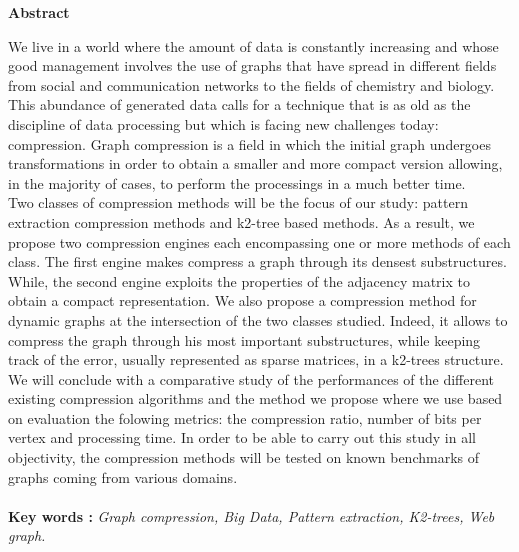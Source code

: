 \newpage
\thispagestyle{plain}
\begin{center}
	\par
	\textbf{
		\vskip 0.5in
		\LARGE 
			Abstract \\[0.15in]
	}
\end{center}
	\par
    
    We live in a world where the amount of data is constantly increasing and whose good management involves the use of graphs that have spread in different fields from social and communication networks to the fields of chemistry and biology. This abundance of generated data calls for a technique that is as old as the discipline of data processing but which is facing new challenges today: compression. Graph compression is a field in which the initial graph undergoes transformations in order to obtain a smaller and more compact version allowing, in the majority of cases, to perform the processings in a much better time.\\

 Two classes of compression methods will be the focus of our study: pattern extraction compression methods and k2-tree based methods. As a result, we propose two compression engines each encompassing one or more methods of each class. The first engine makes  compress a graph through its densest substructures. While, the second engine exploits the properties of the adjacency matrix to obtain a compact representation. We also propose a compression method for dynamic graphs at the intersection of the two classes studied. Indeed, it allows to compress the graph through his most important substructures, while keeping track of the error, usually represented as sparse matrices, in a k2-trees structure.\\
 
 We will conclude with a comparative study of the performances of the different existing compression algorithms and the method we propose where we use based on evaluation the folowing metrics: the compression ratio, number of bits per vertex and processing time. In order to be able to carry out this study in all objectivity, the compression methods will be tested on known benchmarks of graphs coming from various domains. \\\\\textbf{Key words :} \textit{Graph compression, Big Data, Pattern extraction, K2-trees, Web graph.}

\newpage
 

